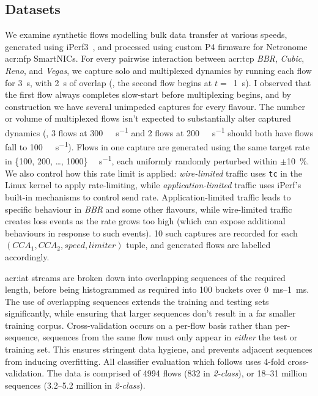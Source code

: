 \subsection{Datasets}\label{sec:seidr-datasets}
We examine synthetic flows modelling bulk data transfer at various speeds, generated using iPerf3~\parencite{iperf3}, and processed using custom P4 firmware for Netronome \gls{acr:nfp} SmartNICs.
For every pairwise interaction between \gls{acr:tcp} \emph{BBR}, \emph{Cubic}, \emph{Reno}, and \emph{Vegas}, we capture solo and multiplexed dynamics by running each flow for \qty{3}{\second}, with \qty{2}{\second} of overlap (\ie, the second flow begins at $t=$~\qty{1}{\second}).
I observed that the first flow always completes slow-start before multiplexing begins, and by construction we have several unimpeded captures for every flavour.
The number or volume of multiplexed flows isn't expected to substantially alter captured dynamics (\ie, 3 flows at \qty{300}{\mega\bit\per\second} and 2 flows at \qty{200}{\mega\bit\per\second} should both have flows fall to \qty{100}{\mega\bit\per\second}).
Flows in one capture are generated using the same target rate in \{\num{100}, \num{200}, \dots, \num{1000}\} \unit{\mega\bit\per\second}, each uniformly randomly perturbed within $\pm$\qty{10}{\percent}.
We also control how this rate limit is applied: \emph{wire-limited} traffic uses \texttt{tc} in the Linux kernel to apply rate-limiting, while \emph{application-limited} traffic uses iPerf's built-in mechanisms to control send rate.
Application-limited traffic leads to specific behaviour in \emph{BBR} and some other flavours, while wire-limited traffic creates loss events as the rate grows too high (which can expose additional behaviours in response to such events).
\num{10} such captures are recorded for each $\left(\mathit{CCA}_1,\mathit{CCA}_2,\mathit{speed},\mathit{limiter}\right)$ tuple, and generated flows are labelled accordingly.

\gls{acr:iat} streams are broken down into overlapping sequences of the required length, before being histogrammed as required into \num{100} buckets over \qtyrange{0}{1}{\milli\second}.
The use of overlapping sequences extends the training and testing sets significantly, while ensuring that larger sequences don't result in a far smaller training corpus.
Cross-validation occurs on a per-flow basis rather than per-sequence, \ie sequences from the same flow must only appear in \emph{either} the test or training set.
This ensures stringent data hygiene, and prevents adjacent sequences from inducing overfitting.
All classifier evaluation which follows uses 4-fold cross-validation.
The data is comprised of \num{4994} flows (\num{832} in \emph{2-class}), or \numrange{18}{31} million sequences (\numrange{3.2}{5.2} million in \emph{2-class}).

